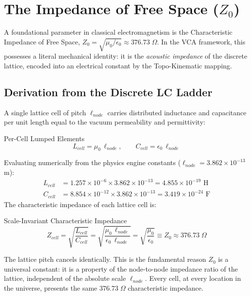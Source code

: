 \section{The Impedance of Free Space (\texorpdfstring{$Z_0$}{Z0})}
\label{sec:z0_derivation}

A foundational parameter in classical electromagnetism is the Characteristic Impedance of Free Space, $Z_0 = \sqrt{\mu_0/\epsilon_0} \approx 376.73\;\Omega$. In the VCA framework, this possesses a literal mechanical identity: it is the \textit{acoustic impedance} of the discrete lattice, encoded into an electrical constant by the Topo-Kinematic mapping.

\subsection{Derivation from the Discrete LC Ladder}

A single lattice cell of pitch $\ell_{node}$ carries distributed inductance and capacitance per unit length equal to the vacuum permeability and permittivity:
\begin{resultbox}{Per-Cell Lumped Elements}
\begin{equation}
    L_{cell} = \mu_0\, \ell_{node}, \qquad C_{cell} = \epsilon_0\, \ell_{node}
    \label{eq:cell_elements}
\end{equation}
\end{resultbox}

Evaluating numerically from the physics engine constants ($\ell_{node} = 3.862 \times 10^{-13}$ m):
\begin{align}
    L_{cell} &= 1.257 \times 10^{-6} \times 3.862 \times 10^{-13} = 4.855 \times 10^{-19} \text{ H} \\
    C_{cell} &= 8.854 \times 10^{-12} \times 3.862 \times 10^{-13} = 3.419 \times 10^{-24} \text{ F}
\end{align}
The characteristic impedance of each lattice cell is:
\begin{resultbox}{Scale-Invariant Characteristic Impedance}
\begin{equation}
    Z_{cell} = \sqrt{\frac{L_{cell}}{C_{cell}}} = \sqrt{\frac{\mu_0\, \ell_{node}}{\epsilon_0\, \ell_{node}}} = \sqrt{\frac{\mu_0}{\epsilon_0}} \equiv Z_0 \approx 376.73\;\Omega
    \label{eq:z0_cell}
\end{equation}
\end{resultbox}

The lattice pitch cancels identically. This is the fundamental reason $Z_0$ is a universal constant: it is a property of the node-to-node impedance ratio of the lattice, independent of the absolute scale $\ell_{node}$. Every cell, at every location in the universe, presents the same $376.73\;\Omega$ characteristic impedance.

